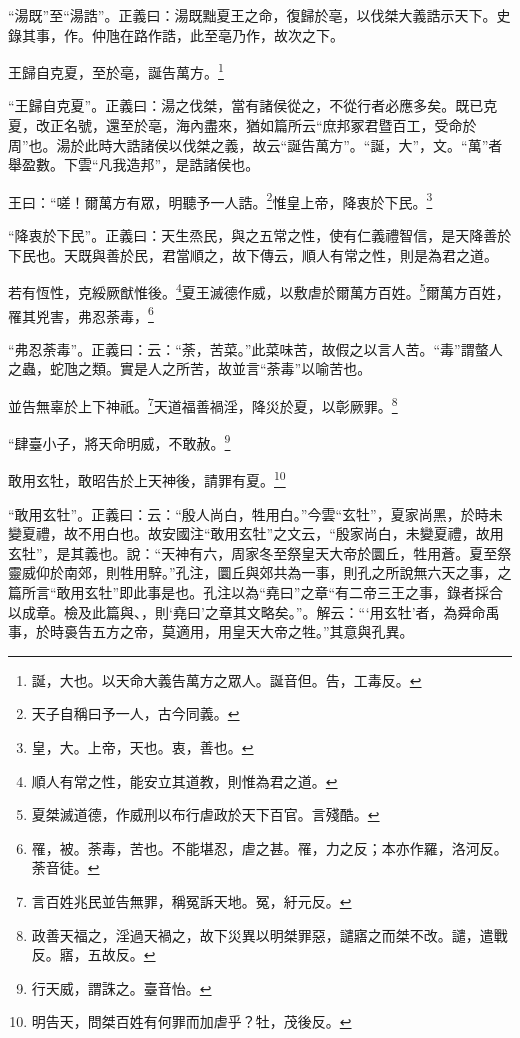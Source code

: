{\noindent\shu{}\fzkt “湯既”至“湯誥”。正義曰：湯既黜夏王之命，復歸於亳，以伐桀大義誥示天下。史錄其事，作。仲虺在路作誥，此至亳乃作，故次之下。 \par}

王歸自克夏，至於亳，誕告萬方。\footnote{誕，大也。以天命大義告萬方之眾人。誕音但。告，工毒反。}

{\noindent\shu{}\fzkt “王歸自克夏”。正義曰：湯之伐桀，當有諸侯從之，不從行者必應多矣。既已克夏，改正名號，還至於亳，海內盡來，猶如篇所云“庶邦冢君暨百工，受命於周”也。湯於此時大誥諸侯以伐桀之義，故云“誕告萬方”。“誕，大”，文。“萬”者舉盈數。下雲“凡我造邦”，是誥諸侯也。 \par}

王曰：“嗟！爾萬方有眾，明聽予一人誥。\footnote{天子自稱曰予一人，古今同義。}惟皇上帝，降衷於下民。\footnote{皇，大。上帝，天也。衷，善也。}

{\noindent\shu{}\fzkt “降衷於下民”。正義曰：天生烝民，與之五常之性，使有仁義禮智信，是天降善於下民也。天既與善於民，君當順之，故下傳云，順人有常之性，則是為君之道。 \par}

若有恆性，克綏厥猷惟後。\footnote{順人有常之性，能安立其道教，則惟為君之道。}夏王滅德作威，以敷虐於爾萬方百姓。\footnote{夏桀滅道德，作威刑以布行虐政於天下百官。言殘酷。}爾萬方百姓，罹其兇害，弗忍荼毒，\footnote{罹，被。荼毒，苦也。不能堪忍，虐之甚。罹，力之反；本亦作羅，洛河反。荼音徒。}

{\noindent\shu{}\fzkt “弗忍荼毒”。正義曰：云：“荼，苦菜。”此菜味苦，故假之以言人苦。“毒”謂螫人之蟲，蛇虺之類。實是人之所苦，故並言“荼毒”以喻苦也。 \par}

並告無辜於上下神祇。\footnote{言百姓兆民並告無罪，稱冤訴天地。冤，紆元反。}天道福善禍淫，降災於夏，以彰厥罪。\footnote{政善天福之，淫過天禍之，故下災異以明桀罪惡，譴寤之而桀不改。譴，遣戰反。寤，五故反。}

“肆臺小子，將天命明威，不敢赦。\footnote{行天威，謂誅之。臺音怡。}

敢用玄牡，敢昭告於上天神後，請罪有夏。\footnote{明告天，問桀百姓有何罪而加虐乎？牡，茂後反。}

{\noindent\shu{}\fzkt “敢用玄牡”。正義曰：云：“殷人尚白，牲用白。”今雲“玄牡”，夏家尚黑，於時未變夏禮，故不用白也。故安國注“敢用玄牡”之文云，“殷家尚白，未變夏禮，故用玄牡”，是其義也。說：“天神有六，周家冬至祭皇天大帝於圜丘，牲用蒼。夏至祭靈威仰於南郊，則牲用騂。”孔注，圜丘與郊共為一事，則孔之所說無六天之事，之篇所言“敢用玄牡”即此事是也。孔注以為“堯曰”之章“有二帝三王之事，錄者採合以成章。檢及此篇與、，則‘堯曰’之章其文略矣。”。解云：“‘用玄牡’者，為舜命禹事，於時裛告五方之帝，莫適用，用皇天大帝之牲。”其意與孔異。 \par}

